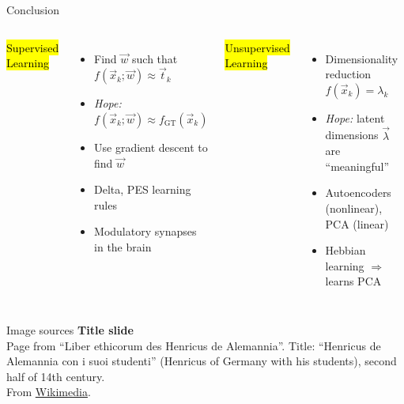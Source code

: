 \documentclass[handout,aspectratio=169]{beamer}
\begin{document}
	\begin{frame}{Conclusion}
		\begin{columns}[T]
			{\centering
			\hl{Supervised Learning}\\[0.25cm]}
			\begin{itemize}
				\setlength{\itemsep}{0.3cm}
				\item Find $\vec w$ such that $f(\vec x_k; \vec w) \approx \vec t_k$
				\item \emph{Hope:} $f(\vec x_k; \vec w) \approx f_\mathrm{GT}(\vec x_k)$
				\item Use gradient descent to find $\vec w$
				\item Delta, PES learning rules
				\item Modulatory synapses in the brain
			\end{itemize}
			{\centering
			\hl{Unsupervised Learning}\\[0.25cm]}
			\begin{itemize}
				\setlength{\itemsep}{0.25cm}
				\item Dimensionality reduction $f(\vec x_k) = \lambda_k$
				\item \emph{Hope:} latent dimensions $\vec \lambda$ are \enquote{meaningful}
				\item Autoencoders (nonlinear),\\PCA (linear)
				\item Hebbian learning $\Rightarrow$ learns PCA
			\end{itemize}
		\end{columns}
	\end{frame}

	\backupbegin

	\begin{frame}[noframenumbering]{Image sources}
		\small
		\textbf{Title slide}\\Page from \enquote{Liber ethicorum des Henricus de Alemannia}. Title: \enquote{Henricus de Alemannia con i suoi studenti} (Henricus of Germany with his students), second half of 14th century.\\From \href{https://commons.wikimedia.org/wiki/File:Laurentius_de_Voltolina_001.jpg}{Wikimedia}.
	\end{frame}

	\backupend
	
\end{document}
